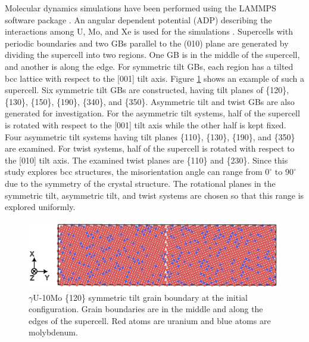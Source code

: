 \documentclass{elsarticle}
\providecommand{\DIFadd}[1]{{\protect\color{blue} \sf #1}} %
\providecommand{\DIFdel}[1]{}
\providecommand{\DIFaddbegin}{} %
\providecommand{\DIFaddend}{} %
\providecommand{\DIFdelbegin}{} %
\providecommand{\DIFdelend}{} %
\providecommand{\DIFaddFL}[1]{\DIFadd{#1}} %
\providecommand{\DIFdelFL}[1]{\DIFdel{#1}} %
\providecommand{\DIFaddbeginFL}{} %
\providecommand{\DIFaddendFL}{} %
\providecommand{\DIFdelbeginFL}{} %
\providecommand{\DIFdelendFL}{} %
\begin{document}
Molecular dynamics simulations have been performed using the LAMMPS software package \cite{lammps}. An angular dependent potential (ADP) describing the interactions among U, Mo, and Xe is used for the simulations \cite{starikov2018, beelerUMoXe}. Supercells with periodic boundaries and two GBs parallel to the (010) plane are generated by dividing the supercell into two regions. \DIFaddbegin \DIFadd{One GB is in the middle of the supercell, and another is along the edge. }\DIFaddend For symmetric tilt GBs, each region has a tilted bcc lattice with respect to the [001] tilt axis. \DIFdelbegin \DIFdel{One of the GBs is in the middle of the supercell, and another is along the edge. }\DIFdelend Figure \ref{fig:gb} shows an example of such a supercell. Six symmetric tilt GBs are constructed, having tilt planes of \{120\}, \{130\}, \{150\}, \{190\}, \{340\}, and \{350\}. Asymmetric tilt and twist GBs are also generated for investigation. For the asymmetric tilt systems, half of the supercell is rotated with respect to the [001] tilt axis while the other half is \DIFdelbegin \DIFdel{held }\DIFdelend \DIFaddbegin \DIFadd{kept }\DIFaddend fixed. Four asymmetric tilt systems having tilt planes \{110\}, \{130\}, \{190\}, and \{350\} are examined. For twist systems, half of the supercell is rotated with respect to the [010] tilt axis. The examined twist planes are \{110\} and \{230\}. Since this study explores bcc structures, the misorientation angle can range from \DIFdelbegin \DIFdel{$0$ to $90$ degrees }\DIFdelend \DIFaddbegin \DIFadd{$0^{\circ}$ to $90^{\circ}$ }\DIFaddend due to the symmetry of the crystal structure. The rotational planes in the symmetric tilt, asymmetric tilt, and twist systems are chosen so that this range is explored uniformly.

\begin{figure}[!ht]
\centering
\DIFdelbeginFL %
\DIFdelendFL \DIFaddbeginFL \includegraphics[height=3cm]{configuration.png}
\DIFaddendFL \caption{$\gamma$U-10Mo \{120\} symmetric tilt grain boundary at the initial configuration. Grain boundaries are in the middle and \DIFdelbeginFL \DIFdelFL{on }\DIFdelendFL \DIFaddbeginFL \DIFaddFL{along }\DIFaddendFL the edges of the supercell. Red atoms are uranium and blue atoms are molybdenum.}
\label{fig:gb}
\end{figure}
\end{document}
